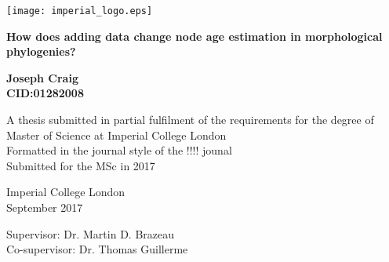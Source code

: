 \documentclass[11pt,letterpaper]{article}
\begin{document}
    \thispagestyle{empty}

    \begin{left}

    \texttt{[image: imperial\_logo.eps]}
    
    \end{left}
    
    \begin{center}    

        \vspace{1.5cm}

        \LARGE
        \textbf{How does adding data change node age estimation in morphological phylogenies?}
        
        
        \vspace{3.5cm}
        
        \Large
        \textbf{Joseph Craig\\
        CID:01282008}
         
        \vspace{1.5cm}
         
        \large
        A thesis submitted in partial fulfilment of the requirements for the degree of Master of Science at Imperial College London \\
        Formatted in the journal style of the !!!! jounal\\ %
        Submitted for the MSc in 2017\\
        
        \vspace{1.0cm}
                
        \large
        Imperial College London\\
        September 2017\\

        \vspace{1.0cm}

        \large
        Supervisor: Dr. Martin D. Brazeau \\ %
        Co-supervisor: Dr. Thomas Guillerme \\
        
    \end{center}
\end{document}
